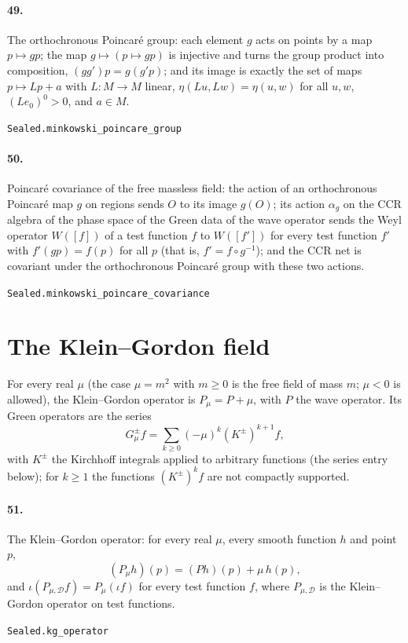 \documentclass[11pt]{article}
\begin{document}
\paragraph{49.} The orthochronous Poincaré group: each element $g$ acts on points by a map $p \mapsto g p$; the map $g \mapsto (p \mapsto g p)$ is injective and turns the group product into composition, $(g g') p = g (g' p)$; and its image is exactly the set of maps $p \mapsto L p + a$ with $L : M \to M$ linear, $\eta(L u, L w) = \eta(u, w)$ for all $u, w$, $(L e_0)^0 > 0$, and $a \in M$.\par{\footnotesize\texttt{Sealed.minkowski\_poincare\_group}}

\paragraph{50.} Poincaré covariance of the free massless field: the action of an orthochronous Poincaré map $g$ on regions sends $O$ to its image $g(O)$; its action $\alpha_g$ on the CCR algebra of the phase space of the Green data of the wave operator sends the Weyl operator $W([f])$ of a test function $f$ to $W([f'])$ for every test function $f'$ with $f'(g p) = f(p)$ for all $p$ (that is, $f' = f \circ g^{-1}$); and the CCR net is covariant under the orthochronous Poincaré group with these two actions.\par{\footnotesize\texttt{Sealed.minkowski\_poincare\_covariance}}

\section*{The Klein–Gordon field}
For every real $\mu$ (the case $\mu = m^2$ with $m \ge 0$ is the free field of mass $m$; $\mu < 0$ is allowed), the Klein–Gordon operator is $P_\mu = P + \mu$, with $P$ the wave operator. Its Green operators are the series \[G_\mu^\pm f = \sum_{k \ge 0} (-\mu)^k (K^\pm)^{k+1} f,\] with $K^\pm$ the Kirchhoff integrals applied to arbitrary functions (the series entry below); for $k \ge 1$ the functions $(K^\pm)^k f$ are not compactly supported.

\paragraph{51.} The Klein–Gordon operator: for every real $\mu$, every smooth function $h$ and point $p$, \[(P_\mu h)(p) = (P h)(p) + \mu\, h(p),\] and $\iota(P_{\mu,\mathcal D} f) = P_\mu(\iota f)$ for every test function $f$, where $P_{\mu, \mathcal D}$ is the Klein–Gordon operator on test functions.\par{\footnotesize\texttt{Sealed.kg\_operator}}
\end{document}
